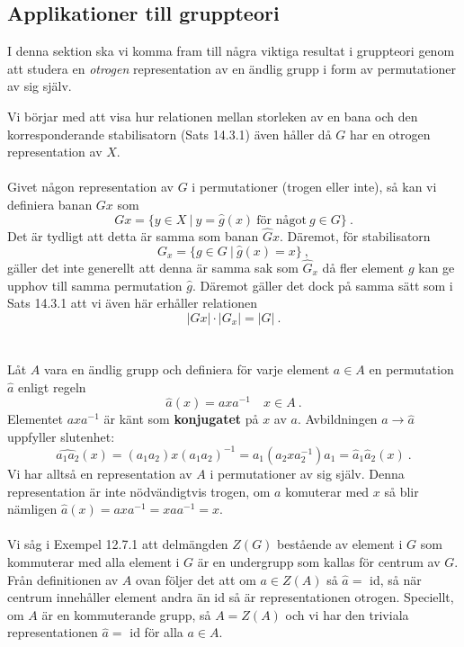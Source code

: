 \documentclass{article}
\begin{document}
\subsection{Applikationer till gruppteori}
I denna sektion ska vi komma fram till några viktiga resultat i gruppteori genom att studera en \textit{otrogen} representation av en ändlig grupp i form av permutationer av sig själv.

Vi börjar med att visa hur relationen mellan storleken av en bana och den korresponderande stabilisatorn (Sats 14.3.1) även håller då $G$ har en otrogen representation av $X$.
\\ \\
Givet någon representation av $G$ i permutationer (trogen eller inte), så kan vi definiera banan $Gx$ som
$$
Gx=\{y\in X \ | \ y=\hat{g}(x) \ \textrm{för något} \ g\in G \} \ .
$$
Det är tydligt att detta är samma som banan $\hat{G}x$. Däremot, för stabilisatorn
$$
G_x=\{g\in G \ | \ \hat{g}(x)=x \} \ ,
$$
gäller det inte generellt att denna är samma sak som $\hat{G}_x$ då fler element $g$ kan ge upphov till samma permutation $\hat{g}$. Däremot gäller det dock på samma sätt som i Sats 14.3.1 att vi även här erhåller relationen 
$$
|Gx|\cdot|G_x|=|G| \ .
$$
\\ \\
Låt $A$ vara en ändlig grupp och definiera för varje element $a\in A$ en permutation $\hat{a}$ enligt regeln
$$
\hat{a}(x)=axa^{-1} \quad x\in A \ .
$$
Elementet $axa^{-1}$ är känt som \textbf{konjugatet} på $x$ av $a$. Avbildningen $a\rightarrow\hat{a}$ uppfyller slutenhet:
$$
\widehat{a_1a_2}(x)=(a_1a_2)x(a_1a_2)^{-1}=a_1(a_2xa_2^{-1})a_1=\hat{a}_1\hat{a}_2(x) \ .
$$
Vi har alltså en representation av $A$ i permutationer av sig själv. Denna representation är inte nödvändigtvis trogen, om $a$ komuterar med $x$ så blir nämligen $\hat{a}(x)=axa^{-1}=xaa^{-1}=x$.
\\ \\
Vi såg i Exempel 12.7.1 att delmängden $Z(G)$ bestående av element i $G$ som kommuterar med alla element i $G$ är en undergrupp som kallas för centrum av $G$. Från definitionen av $A$ ovan följer det att om $a\in Z(A)$ så $\hat{a}=$ id, så när centrum innehåller element andra än id så är representationen otrogen. Speciellt, om $A$ är en kommuterande grupp, så $A=Z(A)$ och vi har den triviala representationen $\hat{a}=$ id för alla $a\in A$.
\end{document}
